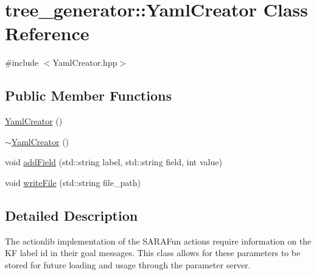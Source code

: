 \hypertarget{classtree__generator_1_1YamlCreator}{\section{tree\-\_\-generator\-:\-:Yaml\-Creator Class Reference}
\label{classtree__generator_1_1YamlCreator}
}


{\ttfamily \#include $<$Yaml\-Creator.\-hpp$>$}

\subsection*{Public Member Functions}
\begin{DoxyCompactItemize}
\item 
\hyperlink{classtree__generator_1_1YamlCreator_a3f6974a64bcceaa2c6e6bb073e760000}{Yaml\-Creator} ()
\item 
\hyperlink{classtree__generator_1_1YamlCreator_ab1d128e8feaf7d64c3a5b9a961e140b7}{$\sim$\-Yaml\-Creator} ()
\item 
void \hyperlink{classtree__generator_1_1YamlCreator_aedbf0bc9538c49e16c2185703a40815b}{add\-Field} (std\-::string label, std\-::string field, int value)
\item 
void \hyperlink{classtree__generator_1_1YamlCreator_af1260eb2488a08879a8cd63418ec571b}{write\-File} (std\-::string file\-\_\-path)
\end{DoxyCompactItemize}


\subsection{Detailed Description}
The actionlib implementation of the S\-A\-R\-A\-Fun actions require information on the K\-F label id in their goal messages. This class allows for these parameters to be stored for future loading and usage through the parameter server. 

